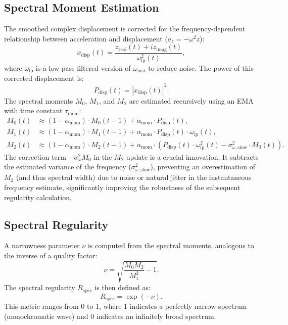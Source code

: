 \documentclass[11pt]{article}
\begin{document}
\subsection{Spectral Moment Estimation}
The smoothed complex displacement is corrected for the frequency-dependent relationship between acceleration and displacement ($a_z = -\omega^2 z$):
\begin{equation}
x_{\text{disp}}(t) = \frac{z_{\text{real}}(t) + i z_{\text{imag}}(t)}{\omega_{\text{lp}}^2(t)},
\end{equation}
where $\omega_{\text{lp}}$ is a low-pass-filtered version of $\omega_{\text{inst}}$ to reduce noise. The power of this corrected displacement is:
\begin{equation}
P_{\text{disp}}(t) = |x_{\text{disp}}(t)|^2.
\end{equation}
The spectral moments $M_0$, $M_1$, and $M_2$ are estimated recursively using an EMA with time constant $\tau_{\text{mom}}$:
\begin{align}
M_0(t) &\approx (1 - \alpha_{\text{mom}}) \cdot M_0(t-1) + \alpha_{\text{mom}} \cdot P_{\text{disp}}(t), \\
M_1(t) &\approx (1 - \alpha_{\text{mom}}) \cdot M_1(t-1) + \alpha_{\text{mom}} \cdot P_{\text{disp}}(t) \cdot \omega_{\text{lp}}(t), \\
M_2(t) &\approx (1 - \alpha_{\text{mom}}) \cdot M_2(t-1) + \alpha_{\text{mom}} \cdot \left( P_{\text{disp}}(t) \cdot \omega_{\text{lp}}^2(t) - \sigma^2_{\omega,\text{slow}} \cdot M_0(t) \right).
\end{align}
The correction term $-\sigma^2_{\omega} M_0$ in the $M_2$ update is a crucial innovation. It subtracts the estimated variance of the frequency ($\sigma^2_{\omega,\text{slow}}$), preventing an overestimation of $M_2$ (and thus spectral width) due to noise or natural jitter in the instantaneous frequency estimate, significantly improving the robustness of the subsequent regularity calculation.

\subsection{Spectral Regularity}
A narrowness parameter $\nu$ is computed from the spectral moments, analogous to the inverse of a quality factor:
\begin{equation}
\nu = \sqrt{ \frac{M_0 M_2}{M_1^2} - 1 }.
\end{equation}
The spectral regularity $R_{\text{spec}}$ is then defined as:
\begin{equation}
R_{\text{spec}} = \exp(-\nu).
\end{equation}
This metric ranges from 0 to 1, where 1 indicates a perfectly narrow spectrum (monochromatic wave) and 0 indicates an infinitely broad spectrum.
\end{document}
